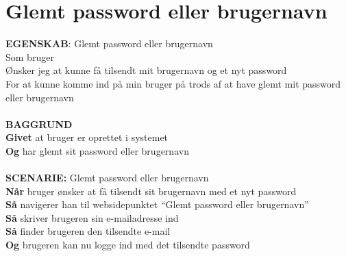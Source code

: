 \section{Glemt password eller brugernavn}
{\color{blue}\textbf{EGENSKAB}:} Glemt password eller brugernavn \\
Som bruger \\
Ønsker jeg at kunne få tilsendt mit brugernavn og et nyt password \\
For at kunne komme ind på min bruger på trods af at have glemt mit password eller brugernavn\\ \\
{\color{blue}\textbf{BAGGRUND}} \\
{\color{blue}\textbf{Givet}} at bruger er oprettet i systemet \\ {\color{blue}\textbf{Og}} har glemt sit password eller brugernavn \\
 \\
{\color{blue}\textbf{SCENARIE:}} Glemt password eller brugernavn \\
{\color{blue}\textbf{Når}} bruger ønsker at få tilsendt sit brugernavn med et nyt password \\
{\color{blue}\textbf{Så}} navigerer han til websidepunktet  “Glemt password eller brugernavn” \\
{\color{blue}\textbf{Så}} skriver brugeren sin e-mailadresse ind\\
{\color{blue}\textbf{Så}} finder brugeren den tilsendte e-mail \\
{\color{blue}\textbf{Og}} brugeren kan nu logge ind med det tilsendte password